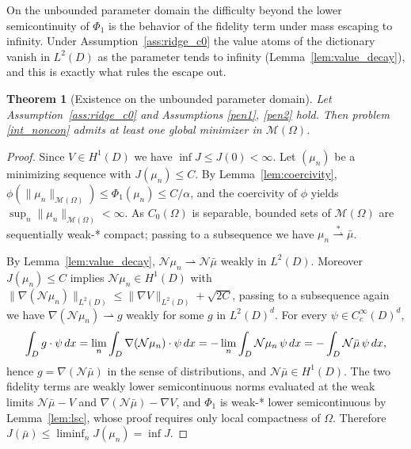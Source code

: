 \documentclass[11pt]{amsart}
\newtheorem{theorem}{Theorem}[section]
\theoremstyle{definition}
\theoremstyle{remark}
\let\div\relax
\DeclareMathOperator{\div}{div}
\begin{document}
On the unbounded parameter domain the difficulty beyond the lower
semicontinuity of $\Phi_1$ is the behavior of the fidelity term under mass
escaping to infinity. Under Assumption~\ref{ass:ridge_c0} the value atoms of
the dictionary vanish in $L^2(D)$ as the parameter tends to infinity
(Lemma~\ref{lem:value_decay}), and this is exactly what rules the escape out.

\begin{theorem}[Existence on the unbounded parameter domain]\label{thm:existence}
Let Assumption~\ref{ass:ridge_c0} and Assumptions \ref{pen1}, \ref{pen2} hold.
Then problem \eqref{int_noncon} admits at least one global
minimizer in $\mathcal{M}(\Omega)$.
\end{theorem}
\begin{proof}
Since $V \in H^1(D)$ we have $\inf J \le J(0) < \infty$. Let $(\mu_n)$ be a
minimizing sequence with $J(\mu_n) \le C$. By Lemma~\ref{lem:coercivity},
$\phi(\|\mu_n\|_{\mathcal{M}(\Omega)}) \le \Phi_1(\mu_n) \le C/\alpha$, and the
coercivity of $\phi$ yields $\sup_n \|\mu_n\|_{\mathcal{M}(\Omega)} < \infty$.
As $C_0(\Omega)$ is separable, bounded sets of $\mathcal{M}(\Omega)$ are
sequentially weak-* compact; passing to a subsequence we have
$\mu_n \overset{*}{\rightharpoonup} \bar{\mu}$.

By Lemma~\ref{lem:value_decay}, $\mathcal{N}\mu_n \rightharpoonup
\mathcal{N}\bar{\mu}$ weakly in $L^2(D)$. Moreover $J(\mu_n) \le C$ implies
$\mathcal{N}\mu_n \in H^1(D)$ with
$\|\nabla(\mathcal{N}\mu_n)\|_{L^2(D)} \le \|\nabla V\|_{L^2(D)} + \sqrt{2C}$,
passing to a subsequence again we have $\nabla(\mathcal{N}\mu_n) \rightharpoonup g$
weakly for some $g$ in $L^2(D)^d$. For every $\psi \in C_c^\infty(D)^d$,
\begin{equation*}
	\int_D g \cdot \psi\, dx
	= \lim_n \int_D \nabla(\mathcal{N}\mu_n) \cdot \psi\, dx
	= -\lim_n \int_D \mathcal{N}\mu_n\, \div \psi\, dx
	= -\int_D \mathcal{N}\bar{\mu}\, \div \psi\, dx,
\end{equation*}
hence $g = \nabla(\mathcal{N}\bar{\mu})$ in the sense of distributions, and
$\mathcal{N}\bar{\mu} \in H^1(D)$. The two fidelity terms are weakly lower
semicontinuous norms evaluated at the weak limits $\mathcal{N}\bar{\mu} - V$
and $\nabla(\mathcal{N}\bar{\mu}) - \nabla V$, and $\Phi_1$ is weak-* lower
semicontinuous by Lemma~\ref{lem:lsc}, whose proof requires only local
compactness of $\Omega$. Therefore
$J(\bar{\mu}) \le \liminf_n J(\mu_n) = \inf J$.
\end{proof}
\end{document}
